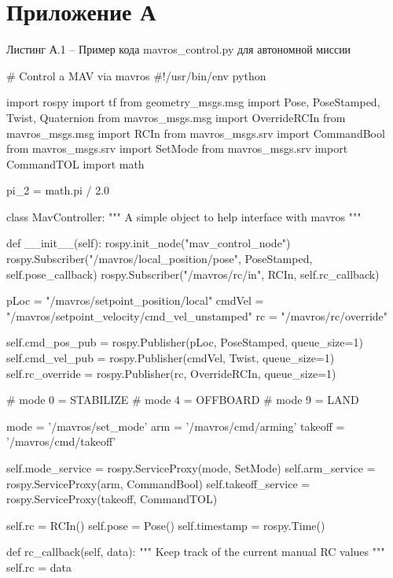 \documentclass[a4paper,12pt]{article}
\begin{document}
\pagebreak
\section*{ \centering Приложение А} 

\begin{center}
	Листинг А.1 -- Пример кода mavros\_control.py для автономной миссии
\end{center}


\begin{MyCode}

# Control a MAV via mavros
#!/usr/bin/env python

import rospy
import tf
from geometry_msgs.msg import Pose, PoseStamped, Twist, Quaternion
from mavros_msgs.msg import OverrideRCIn
from mavros_msgs.msg import RCIn
from mavros_msgs.srv import CommandBool
from mavros_msgs.srv import SetMode
from mavros_msgs.srv import CommandTOL
import math

pi_2 = math.pi / 2.0

class MavController:
	"""
	A simple object to help interface with mavros
	"""
	
	def __init__(self):
		rospy.init_node("mav_control_node")
		rospy.Subscriber("/mavros/local_position/pose",
				 PoseStamped, self.pose_callback)
		rospy.Subscriber("/mavros/rc/in", RCIn,
				 self.rc_callback)
		
		pLoc = "/mavros/setpoint_position/local"
		cmdVel = "/mavros/setpoint_velocity/cmd_vel_unstamped"
		rc = "/mavros/rc/override"
		
		self.cmd_pos_pub = rospy.Publisher(pLoc, PoseStamped,
				 		  queue_size=1)
		self.cmd_vel_pub = rospy.Publisher(cmdVel, Twist,
						   queue_size=1)
		self.rc_override = rospy.Publisher(rc, OverrideRCIn,
						   queue_size=1)
		
		# mode 0 = STABILIZE
		# mode 4 = OFFBOARD
		# mode 9 = LAND
		
		mode = '/mavros/set_mode'
		arm = '/mavros/cmd/arming'
		takeoff = '/mavros/cmd/takeoff'
		
		self.mode_service = rospy.ServiceProxy(mode, SetMode)
		self.arm_service = rospy.ServiceProxy(arm,
						      CommandBool)
		self.takeoff_service = rospy.ServiceProxy(takeoff,
						          CommandTOL)
		
		self.rc = RCIn()
		self.pose = Pose()
		self.timestamp = rospy.Time()
		
	def rc_callback(self, data):
		"""
		Keep track of the current manual RC values
		"""
		self.rc = data
		

\end{MyCode}
\end{document}
